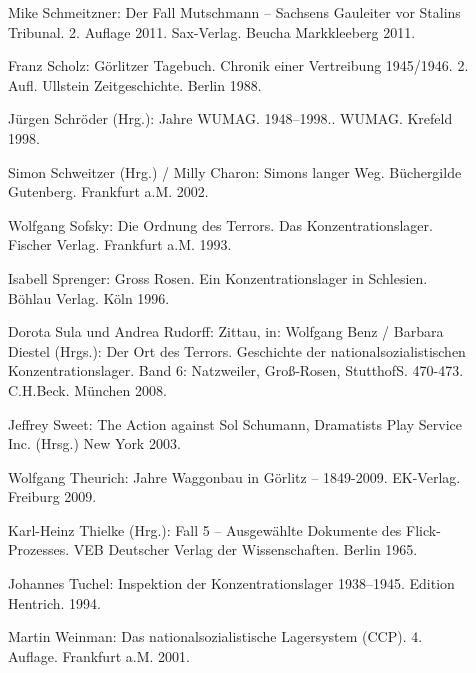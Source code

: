 \documentclass[a4paper,12pt,ngerman,
]{nisebook}
\begin{document}
\begin{description}
\item[]{Mike Schmeitzner: \glqq Der Fall Mutschmann -- Sachsens Gauleiter vor Stalins Tribunal\grqq. 2. Auflage 2011. Sax-Verlag. Beucha Markkleeberg 2011.}

\item[]{Franz Scholz: \glqq Görlitzer Tagebuch\grqq. Chronik einer Vertreibung 1945/1946. 2. Aufl. Ullstein Zeitgeschichte. Berlin 1988.}

\item[]{Jürgen Schröder (Hrg.):  Jahre WUMAG. 1948--1998.\grqq. WUMAG. Krefeld 1998. }

\item[]{Simon Schweitzer (Hrg.) / Milly Charon: \glqq Simons langer Weg\grqq. Büchergilde Gutenberg. Frankfurt a.M. 2002.}

\item[]{Wolfgang Sofsky: \glqq Die Ordnung des Terrors. Das Konzentrationslager\grqq. Fischer Verlag. Frankfurt a.M. 1993.}

\item[]{Isabell Sprenger: \glqq Gross Rosen. Ein Konzentrationslager in Schlesien\grqq. Böhlau Verlag. Köln 1996. }

\item[]{Dorota Sula und Andrea Rudorff: \glqq Zittau\grqq, in: Wolfgang Benz / Bar\-bara Die\-st\-el (Hrgs.): \glqq Der Ort des Terrors. Geschichte der nationalsozialistischen Konzentrationslager. Band 6: Natzweiler, Groß-Rosen, Stutthof\grqq S. 470-473. C.H.Beck. Mün\-chen 2008.}

\item[]{Jeffrey Sweet: \glqq The Action against Sol Schumann\grqq, Dramatists Play Service Inc. (Hrsg.) New York 2003.}

\item[]{Wolfgang Theurich:  Jahre Waggonbau in Görlitz -- 1849-2009\grqq. EK-Verlag. Freiburg 2009. }

\item[]{Karl-Heinz Thielke (Hrg.): \glqq Fall 5 -- Ausgewählte Dokumente des Flick-Prozesses\grqq. VEB Deutscher Verlag der Wissenschaften. Berlin 1965.}

\item[]{Johannes Tuchel: \glqq Inspektion der Konzentrationslager 1938--1945\grqq. Edition Hentrich. 1994.}

\item[]{Martin Weinman: \glqq Das nationalsozialistische Lagersystem (CCP)\grqq. 4. Auflage. Frankfurt a.M. 2001. }


\end{description}
\end{document}
